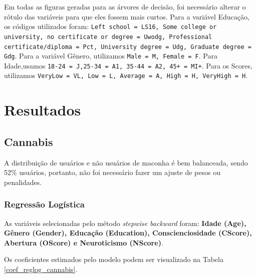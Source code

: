 \documentclass[
	article,			%
	11pt,				%
	oneside,			%
	a4paper,			%
	english,			%
	brazil,				%
	sumario=tradicional
	]{abntex2}
\begin{document}
Em todas as figuras geradas para as árvores de decisão, foi necessário alterar o rótulo das variáveis para que eles fossem mais curtos. Para a variável Educação, os códigos utilizados foram: \texttt{Left school = LS16, Some college or university, no certificate or degree = Uwodg, Professional certificate/diploma = Pct, University degree = Udg, Graduate degree = Gdg}. Para a variável Gênero, utilizamos \texttt{Male = M, Female = F}. Para Idade,usamos \texttt{18-24 = J,25-34 = A1, 35-44 = A2, 45+ = MI+}. Para os Scores, utilizamos \texttt{VeryLow = VL, Low = L, Average = A, High = H, VeryHigh = H}.



\section{Resultados}


\subsection{Cannabis}

A distribuição de usuários e não usuários de maconha é bem balanceada, sendo 52\% usuários, portanto, não foi necessário fazer um ajuste de pesos ou penalidades. 

\subsubsection{Regressão Logística}

As variáveis selecionadas pelo método \emph{stepwise backward} foram: \textbf{Idade (Age), Gênero (Gender), Educação (Education), Conscienciosidade (CScore), Abertura (OScore) e Neuroticismo (NScore)}. 

Os coeficientes estimados pelo modelo podem ser visualizado na Tabela \ref{coef_reglog_cannabis}.
\end{document}
